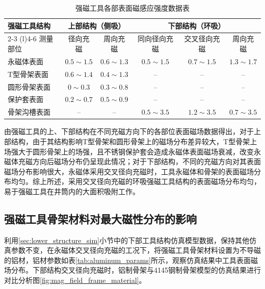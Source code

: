 \begin{table}[htbp]
    \centering
    \caption{强磁工具各部表面磁感应强度数据表}
    \label{tab:strong_magnet_data}
    \renewcommand{\arraystretch}{1.25}
    \small
    \begin{tabular}{lccccc}
        \toprule
        强磁工具结构 & \multicolumn{2}{c}{上部结构（侧吸）} & \multicolumn{3}{c}{下部结构（环吸）} \\
        \cmidrule(r){2-3} \cmidrule(l){4-6}
        测量部位 & 径向充磁 & 周向充磁 & 同向径向充磁 & 交叉径向充磁 & 周向充磁 \\
        \midrule
        永磁体表面 & $0.5\sim 1.5$ & $0.6\sim 1.3$ & $0.5\sim 1.5$ & $0.7\sim 1.5$ & $1.3\sim 1.7$ \\
        T型骨架表面 & $0.6\sim 1.4$ & $0.4\sim 1.3$ & -- & -- & -- \\
        圆形骨架表面 & $0\sim 0.3$ & $0.3\sim 0.8$ & -- & -- & -- \\
        保护套表面 & $0.2\sim 0.7$ & $0.5\sim 0.9$ & -- & -- & -- \\
        骨架沟槽表面 & -- & -- & $0.5\sim 3.5$ & $1.2\sim 3.5$ & $0.7\sim 3.5$ \\
        \bottomrule
    \end{tabular}
    \par{}
\end{table}

由强磁工具的上、下部结构在不同充磁方向下的各部位表面磁场数据得出，对于上部结构，由于其结构影响T型骨架和圆形骨架上的磁场分布差异较大，T型骨架上场强大于圆形骨架上的场强，且不锈钢保护套会造成永磁体表面磁场衰减，改变永磁体充磁方向后磁场分布仍呈现此情况；对于下部结构，不同的充磁方向对其表面磁场分布影响很大，永磁体采用交叉径向充磁时，工具永磁体和骨架的表面磁场分布均匀。综上所述，采用交叉径向充磁的环吸强磁工具结构的表面磁场分布均匀，易于强磁工具在井筒内的大面积吸附工作。


\subsection{强磁工具骨架材料对最大磁性分布的影响}

利用\ref{sec:lower_structure_sim}小节中的下部工具结构仿真模型数据，保持其他仿真参数不变，在永磁体交叉径向充磁的工况下，将强磁工具骨架材料设置为不导磁的铝材，铝材参数如表\ref{tab:aluminum_params}所示，观察仿真结果中工具表面磁场分布。下部结构交叉径向充磁时，铝制骨架与4145钢制骨架模型的仿真结果进行对比分析图\ref{fig:mag_field_frame_material}。

